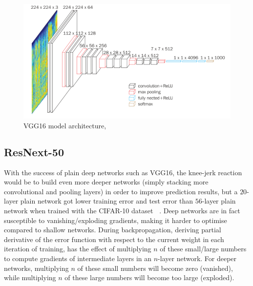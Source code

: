 \documentclass[12pt]{report}
\numberwithin{equation}{section}
\begin{document}
\begin{figure}[H]
\centering
\includegraphics[scale=0.8]{png/vgg16.png}
\caption[VGG16 model architecture]{VGG16 model architecture, \protect\textbf{\cite{Das2019DoubleCV}}}	
\label{fig:vgg16_arch}
\end{figure} 



\subsection{ResNext-50}
With the success of plain deep networks such as VGG16, the knee-jerk reaction would be to build even more deeper networks (simply stacking more convolutional and pooling layers) in order to improve prediction results, but a $20$-layer plain network got lower training error and test error than $56$-layer plain network when trained with the CIFAR-10 dataset \textbf{~\cite{He2015DeepRL}}. Deep networks are in fact susceptible to vanishing/exploding gradients, making it harder to optimise compared to shallow networks. During backpropagation, deriving partial derivative of the error function with respect to the current weight in each iteration of training, has the effect of multiplying $n$ of these small/large numbers to compute gradients of intermediate layers in an $n$-layer network. For deeper networks, multiplying $n$ of these small numbers will become zero (vanished), while multiplying $n$ of these large numbers will become too large (exploded).
\end{document}
